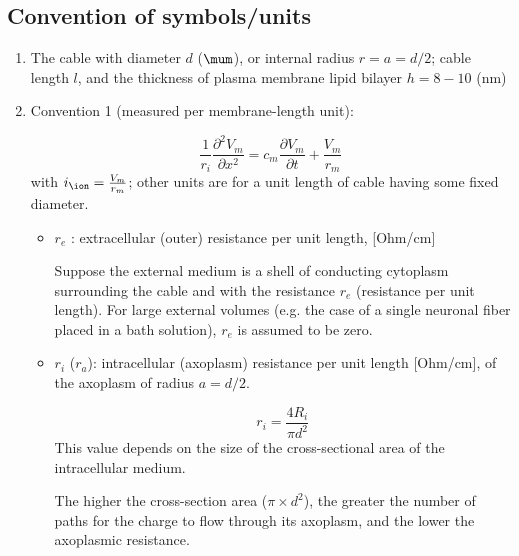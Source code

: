 



\subsection{Convention of symbols/units}
\label{sec:specific-resistivity}


\begin{enumerate}
  \item The cable with diameter $d$ ($\mum$), or internal radius $r=a=d/2$;
  cable length $l$, and the thickness of plasma membrane lipid bilayer $h=8-10$
  (nm)
  
  \item Convention 1 (measured per membrane-length unit):
  
  \begin{equation}
  \frac{1}{r_i}\frac{\partial^2 V_m}{\partial x^2} = c_m \frac{\partial
  V_m}{\partial t} + \frac{V_m}{r_m}
  \end{equation}
  with $i_\ion = \frac{V_m}{r_m}$; other units are for a unit length of cable
  having some fixed diameter.
  
  \begin{itemize}
    \item $r_e$ : extracellular (outer) resistance per unit length, [Ohm/cm]

  Suppose the external medium is a shell of conducting cytoplasm surrounding the
  cable and with the resistance $r_e$ (resistance per unit length).
  For large external volumes (e.g. the case of a single neuronal fiber placed
  in a bath solution), $r_e$ is assumed to be zero. 

    \item $r_i$ ($r_a$): intracellular (axoplasm) resistance per unit length
    [Ohm/cm], of the axoplasm of radius $a=d/2$.

\begin{equation}
r_i = \frac{4 R_i}{\pi d^2}
\end{equation}
This value depends on the size of the cross-sectional area of the intracellular
medium.

The higher the cross-section area ($\pi \times d^2$), the greater the number of
paths for the charge to flow through its axoplasm, and the lower the axoplasmic
resistance.


\end{itemize}
\end{enumerate}
